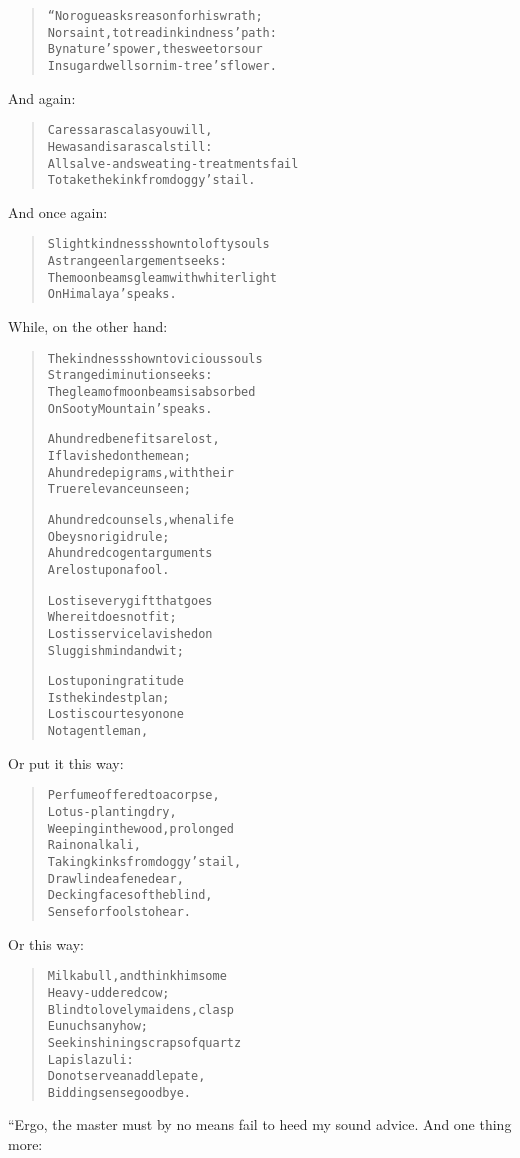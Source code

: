 \documentclass[article, twoside, 14pt]{memoir}
\renewenvironment{verbatim}{%
\begin{quote}%
\vskip -10pt%
\begin{alltt}\normalfont\large}{\end{alltt}%
\end{quote}%
\vskip -10pt
} %
\begin{document}
\begin{verbatim}
“No rogue asks reason for his wrath;
Nor saint, to tread in kindness' path:
By nature's power, the sweet or sour
In sugar dwells or nim-tree's flower.
\end{verbatim}
And again:

\begin{verbatim}
Caress a rascal as you will,
He was and is a rascal still:
All salve- and sweating-treatments fail
To take the kink from doggy's tail.
\end{verbatim}
And once again:

\begin{verbatim}
Slight kindness shown to lofty souls
A strange enlargement seeks:
The moonbeams gleam with whiter light
On Himalaya's peaks.
\end{verbatim}
While, on the other hand:

\begin{verbatim}
The kindness shown to vicious souls
    Strange diminution seeks:
The gleam of moonbeams is absorbed
    On Sooty Mountain's peaks.

A hundred benefits are lost,
    If lavished on the mean;
A hundred epigrams, with their
    True relevance unseen;

A hundred counsels, when a life
    Obeys no rigid rule;
A hundred cogent arguments
    Are lost upon a fool.

Lost is every gift that goes
    Where it does not fit;
Lost is service lavished on
    Sluggish mind and wit;

Lost upon ingratitude
    Is the kindest plan;
Lost is courtesy on one
    Not a gentleman,
\end{verbatim}
Or put it this way:

\begin{verbatim}
Perfume offered to a corpse,
    Lotus-planting dry,
Weeping in the wood, prolonged
    Rain on alkali,
Taking kinks from doggy's tail,
    Drawl in deafened ear,
Decking faces of the blind,
    Sense for fools to hear.
\end{verbatim}
Or this way:

\begin{verbatim}
Milk a bull, and think him some
    Heavy-uddered cow;
Blind to lovely maidens, clasp
    Eunuchs anyhow;
Seek in shining scraps of quartz
    Lapis lazuli:
Do not serve an addlepate,
    Bidding sense goodbye.
\end{verbatim}
“Ergo, the master must by no means fail to heed my sound advice.
And one thing more:
\end{document}
